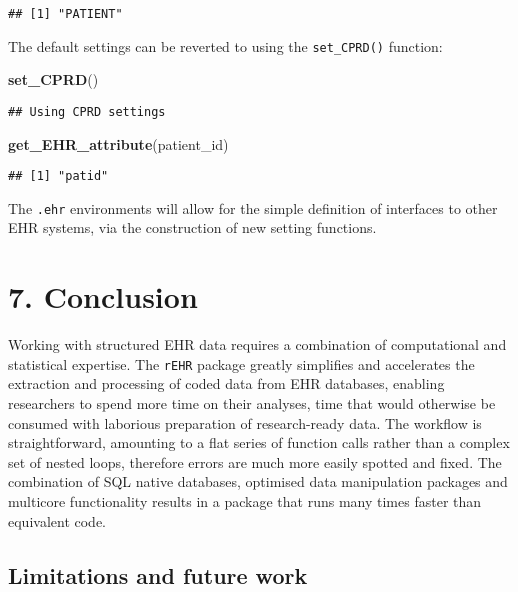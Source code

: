 \documentclass[]{article}
\newenvironment{Shaded}{\begin{snugshade}}{\end{snugshade}}
\newcommand{\KeywordTok}[1]{\textcolor[rgb]{0.13,0.29,0.53}{\textbf{{#1}}}}
\newcommand{\NormalTok}[1]{{#1}}
\begin{document}
\begin{verbatim}
## [1] "PATIENT"
\end{verbatim}

The default settings can be reverted to using the \texttt{set\_CPRD()}
function:

\begin{Shaded}
\begin{Highlighting}[]
\KeywordTok{set_CPRD}\NormalTok{()}
\end{Highlighting}
\end{Shaded}

\begin{verbatim}
## Using CPRD settings
\end{verbatim}

\begin{Shaded}
\begin{Highlighting}[]
\KeywordTok{get_EHR_attribute}\NormalTok{(patient_id)}
\end{Highlighting}
\end{Shaded}

\begin{verbatim}
## [1] "patid"
\end{verbatim}

The \texttt{.ehr} environments will allow for the simple definition of
interfaces to other EHR systems, via the construction of new setting
functions.

\section{7. Conclusion}\label{conclusion}

Working with structured EHR data requires a combination of computational
and statistical expertise. The \texttt{rEHR} package greatly simplifies
and accelerates the extraction and processing of coded data from EHR
databases, enabling researchers to spend more time on their analyses,
time that would otherwise be consumed with laborious preparation of
research-ready data. The workflow is straightforward, amounting to a
flat series of function calls rather than a complex set of nested loops,
therefore errors are much more easily spotted and fixed. The combination
of SQL native databases, optimised data manipulation packages and
multicore functionality results in a package that runs many times faster
than equivalent code.

\subsection{Limitations and future
work}\label{limitations-and-future-work}
\end{document}

